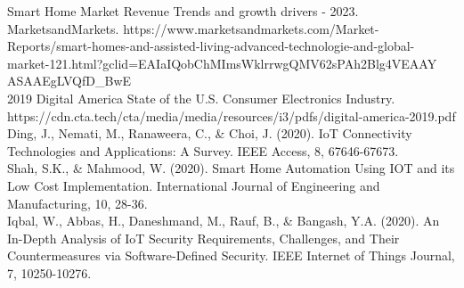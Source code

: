 \documentclass[conference]{IEEEtran}
\begin{document}
\begin{thebibliography}{00}
 Smart Home Market Revenue Trends and growth drivers - 2023. MarketsandMarkets. https://www.marketsandmarkets.com/Market-Reports/smart-homes-and-assisted-living-advanced-technologie-and-global-market-121.html?gclid=EAIaIQobChMImsWklrrwgQMV62sPAh2Blg4VEAAY\\ASAAEgLVQfD\_BwE \\
 2019 Digital America State of the U.S. Consumer Electronics Industry. https://cdn.cta.tech/cta/media/media/resources/i3/pdfs/digital-america-2019.pdf \\
 Ding, J., Nemati, M., Ranaweera, C., \& Choi, J. (2020). IoT Connectivity Technologies and Applications: A Survey. IEEE Access, 8, 67646-67673.\\
 Shah, S.K., \& Mahmood, W. (2020). Smart Home Automation Using IOT and its Low Cost Implementation. International Journal of Engineering and Manufacturing, 10, 28-36.\\
 Iqbal, W., Abbas, H., Daneshmand, M., Rauf, B., \& Bangash, Y.A. (2020). An In-Depth Analysis of IoT Security Requirements, Challenges, and Their Countermeasures via Software-Defined Security. IEEE Internet of Things Journal, 7, 10250-10276.


\end{thebibliography}
\end{document}
